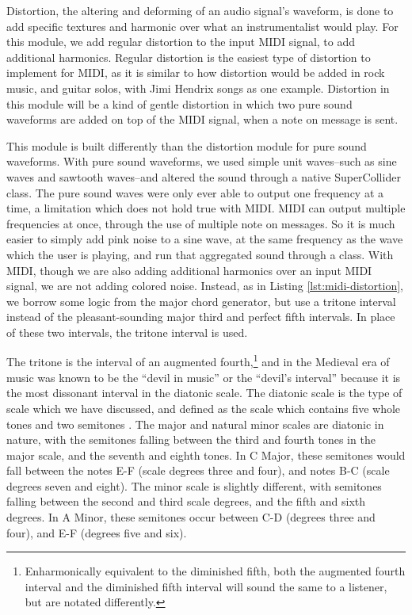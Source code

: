 Distortion, the altering and deforming of an audio signal's waveform, is done to add specific textures and harmonic over what an instrumentalist would play. For this module, we add regular distortion to the input MIDI signal, to add additional harmonics. Regular distortion is the easiest type of distortion to implement for MIDI, as it is similar to how distortion would be added in rock music, and guitar solos, with Jimi Hendrix songs as one example. Distortion in this module will be a kind of gentle distortion in which two pure sound waveforms are added on top of the MIDI signal, when a note on message is sent. 

This module is built differently than the distortion module for pure sound waveforms. With pure sound waveforms, we used simple unit waves--such as sine waves and sawtooth waves--and altered the sound through a native SuperCollider class. The pure sound waves were only ever able to output one frequency at a time, a limitation which does not hold true with MIDI. MIDI can output multiple frequencies at once, through the use of multiple note on messages. So it is much easier to simply add pink noise to a sine wave, at the same frequency as the wave which the user is playing, and run that aggregated sound through a class. With MIDI, though we are also adding additional harmonics over an input MIDI signal, we are not adding colored noise. Instead, as in Listing \ref{lst:midi-distortion}, we borrow some logic from the major chord generator, but use a tritone interval instead of the pleasant-sounding major third and perfect fifth intervals. In place of these two intervals, the tritone interval is used. 

The tritone is the interval of an augmented fourth,\footnote{Enharmonically equivalent to the diminished fifth, both the augmented fourth interval and the diminished fifth interval will sound the same to a listener, but are notated differently.} and in the Medieval era of music was known to be the ``devil in music'' or the ``devil's interval'' because it is the most dissonant interval in the diatonic scale. The diatonic scale is the type of scale which we have discussed, and defined as the scale which contains five whole tones and two semitones \cite{Burkholder_Grout_Palisca_2014}. The major and natural minor scales are diatonic in nature, with the semitones falling between the third and fourth tones in the major scale, and the seventh and eighth tones. In C Major, these semitones would fall between the notes E-F (scale degrees three and four), and notes B-C (scale degrees seven and eight). The minor scale is slightly different, with semitones falling between the second and third scale degrees, and the fifth and sixth degrees. In A Minor, these semitones occur between C-D (degrees three and four), and E-F (degrees five and six).

